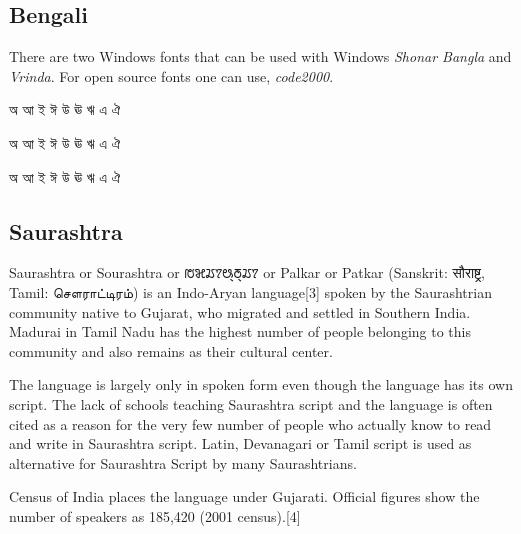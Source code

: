 \subsection{Bengali}

There are two Windows fonts that can be used with Windows \textit{Shonar Bangla} and \textit{Vrinda}. For open source fonts one can use, \textit{code2000}.
\bigskip

\bgroup
\newfontfamily{}


\bengali
\centering

  অ  আ ই  ঈ  উ  ঊ  ঋ  এ  ঐ\par


\centering

  অ  আ ই  ঈ  উ  ঊ  ঋ  এ  ঐ\par



\centering

  অ  আ ই  ঈ  উ  ঊ  ঋ  এ  ঐ\par

\egroup

\subsection{Saurashtra}
\newfontfamily{}

Saurashtra or Sourashtra or {\saurashtra ꢱꣃꢬꢵꢰ꣄ꢜ꣄ꢬꢵ} or Palkar or Patkar (Sanskrit: सौराष्ट्र, Tamil: சௌராட்டிரம்) is an Indo-Aryan language[3] spoken by the Saurashtrian community native to Gujarat, who migrated and settled in Southern India. Madurai in Tamil Nadu has the highest number of people belonging to this community and also remains as their cultural center.

The language is largely only in spoken form even though the language has its own script. The lack of schools teaching Saurashtra script and the language is often cited as a reason for the very few number of people who actually know to read and write in Saurashtra script. Latin, Devanagari or Tamil script is used as alternative for Saurashtra Script by many Saurashtrians.

Census of India places the language under Gujarati. Official figures show the number of speakers as 185,420 (2001 census).[4]



